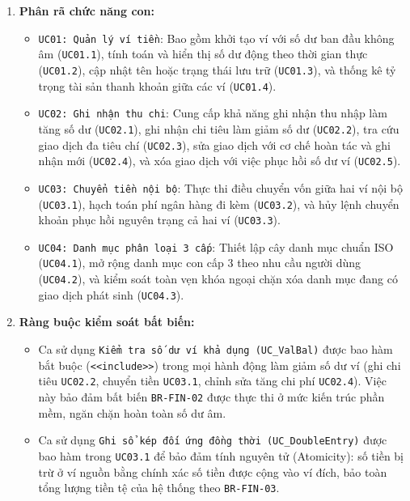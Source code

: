 \documentclass[11pt,a4paper]{article}
\providecommand{\tightlist}{
  \setlength{\itemsep}{0pt}\setlength{\parskip}{0pt}}
\begin{document}
\begin{enumerate}
\def\labelenumi{\arabic{enumi}.}
\item
  \textbf{Phân rã chức năng con:}

  \begin{itemize}
  \tightlist
  \item
    \texttt{UC01:\ Quản\ lý\ ví\ tiền}: Bao gồm khởi tạo ví với số dư
    ban đầu không âm (\texttt{UC01.1}), tính toán và hiển thị số dư động
    theo thời gian thực (\texttt{UC01.2}), cập nhật tên hoặc trạng thái
    lưu trữ (\texttt{UC01.3}), và thống kê tỷ trọng tài sản thanh khoản
    giữa các ví (\texttt{UC01.4}).
  \item
    \texttt{UC02:\ Ghi\ nhận\ thu\ chi}: Cung cấp khả năng ghi nhận thu
    nhập làm tăng số dư (\texttt{UC02.1}), ghi nhận chi tiêu làm giảm số
    dư (\texttt{UC02.2}), tra cứu giao dịch đa tiêu chí
    (\texttt{UC02.3}), sửa giao dịch với cơ chế hoàn tác và ghi nhận mới
    (\texttt{UC02.4}), và xóa giao dịch với việc phục hồi số dư ví
    (\texttt{UC02.5}).
  \item
    \texttt{UC03:\ Chuyển\ tiền\ nội\ bộ}: Thực thi điều chuyển vốn giữa
    hai ví nội bộ (\texttt{UC03.1}), hạch toán phí ngân hàng đi kèm
    (\texttt{UC03.2}), và hủy lệnh chuyển khoản phục hồi nguyên trạng cả
    hai ví (\texttt{UC03.3}).
  \item
    \texttt{UC04:\ Danh\ mục\ phân\ loại\ 3\ cấp}: Thiết lập cây danh
    mục chuẩn ISO (\texttt{UC04.1}), mở rộng danh mục con cấp 3 theo nhu
    cầu người dùng (\texttt{UC04.2}), và kiểm soát toàn vẹn khóa ngoại
    chặn xóa danh mục đang có giao dịch phát sinh (\texttt{UC04.3}).
  \end{itemize}
\item
  \textbf{Ràng buộc kiểm soát bất biến:}

  \begin{itemize}
  \tightlist
  \item
    Ca sử dụng \texttt{Kiểm\ tra\ số\ dư\ ví\ khả\ dụng\ (UC\_ValBal)}
    được bao hàm bắt buộc
    (\texttt{\textless{}\textless{}include\textgreater{}\textgreater{}})
    trong mọi hành động làm giảm số dư ví (ghi chi tiêu \texttt{UC02.2},
    chuyển tiền \texttt{UC03.1}, chỉnh sửa tăng chi phí
    \texttt{UC02.4}). Việc này bảo đảm bất biến \texttt{BR-FIN-02} được
    thực thi ở mức kiến trúc phần mềm, ngăn chặn hoàn toàn số dư âm.
  \item
    Ca sử dụng
    \texttt{Ghi\ sổ\ kép\ đối\ ứng\ đồng\ thời\ (UC\_DoubleEntry)} được
    bao hàm trong \texttt{UC03.1} để bảo đảm tính nguyên tử (Atomicity):
    số tiền bị trừ ở ví nguồn bằng chính xác số tiền được cộng vào ví
    đích, bảo toàn tổng lượng tiền tệ của hệ thống theo
    \texttt{BR-FIN-03}.
  \end{itemize}
\end{enumerate}
\end{document}
